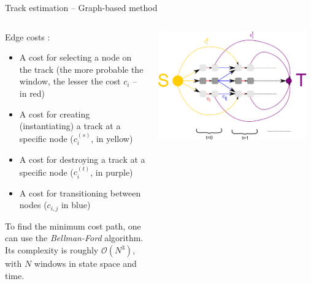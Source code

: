 \documentclass[final]{beamer}
\begin{document}
  \begin{frame}
    \begin{block}{\huge Track estimation -- Graph-based method}
      \LARGE
      \begin{columns}
        \begin{column}{.45\textwidth}
          Edge costs :
          \begin{itemize}
            \item A cost for selecting a node on the track (the more probable the
            window, the lesser the cost $c_i$ -- in red)
            
            \item A cost for creating (instantiating) a track at a specific node
            ($c_i^{\left( s \right)}$, in yellow)
            
            \item A cost for destroying a track at a specific node ($c_i^{\left( t
            \right)}$, in purple)
            
            \item A cost for transitioning between nodes ($c_{i, j}$ in blue)
          \end{itemize}
          To find the minimum cost path, one can use the \emph{Bellman-Ford} algorithm. Its complexity is roughly $\mathcal{O} \left( N^3 \right)$, with $N$ windows in state space and time.
        \end{column}
        \begin{column}{.50\textwidth}
          \includegraphics[width=0.95\textwidth]{figures/graph-sketch.png}
        \end{column}
      \end{columns}
    \end{block}
  \end{frame}
\end{document}
